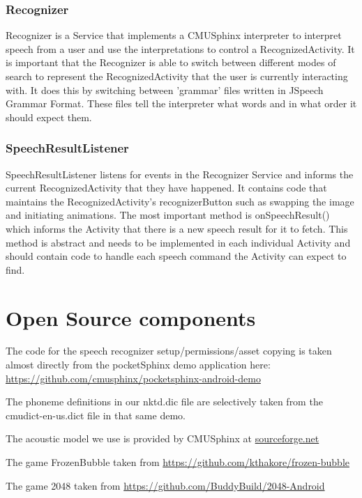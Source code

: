 \documentclass[11pt, oneside]{article}
\begin{document}
\subsubsection{Recognizer}
Recognizer is a Service that implements a CMUSphinx interpreter to
interpret speech from a user and use the interpretations to control a
RecognizedActivity. It is important that the Recognizer is able to
switch between different modes of search to represent the
RecognizedActivity that the user is currently interacting with. It
does this by switching between 'grammar' files written in JSpeech
Grammar Format. These files tell the interpreter what words and in
what order it should expect them.

\subsubsection{SpeechResultListener}
SpeechResultListener listens for events in the Recognizer Service and
informs the current RecognizedActivity that they have happened. It
contains code that maintains the RecognizedActivity's recognizerButton
such as swapping the image and initiating animations. The most
important method is onSpeechResult() which informs the Activity that
there is a new speech result for it to fetch. This method is abstract
and needs to be implemented in each individual Activity and should
contain code to handle each speech command the Activity can expect to
find.

\section{Open Source components}

The code for the speech recognizer setup/permissions/asset copying is
taken almost directly from the pocketSphinx demo application here:
\url{https://github.com/cmusphinx/pocketsphinx-android-demo}

The phoneme definitions in our nktd.dic file are selectively taken
from the cmudict-en-us.dict file in that same demo.

The acoustic model we use is provided by CMUSphinx at
\href{https://sourceforge.net/projects/cmusphinx/files/Acoustic\%20and\%20Language\%20Models/US\%20English/}{sourceforge.net}

The game FrozenBubble taken from
\url{https://github.com/kthakore/frozen-bubble}

The game 2048 taken from
\url{https://github.com/BuddyBuild/2048-Android}
    
\end{document}
